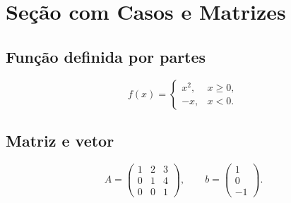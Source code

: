 \section{Seção com Casos e Matrizes}

\subsection{Função definida por partes}

\begin{equation}
  f(x) =
  \begin{cases}
    x^2, & x \ge 0,\\
    -x,  & x < 0.
  \end{cases}
\end{equation}

\subsection{Matriz e vetor}

\[
A =
\begin{pmatrix}
1 & 2 & 3\\
0 & 1 & 4\\
0 & 0 & 1
\end{pmatrix},
\qquad
b =
\begin{pmatrix}
1\\
0\\
-1
\end{pmatrix}.
\]
